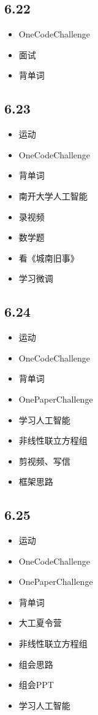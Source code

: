 \documentclass[UTF8]{ctexart}
\begin{document}
\subsection*{6.22}
\begin{itemize}
    \item OneCodeChallenge
    \item 面试
    \item 背单词
\end{itemize}

\subsection*{6.23}
\begin{itemize}
    \item 运动
    \item OneCodeChallenge
    \item 背单词
    \item 南开大学人工智能
    \item 录视频
    \item 数学题
    \item 看《城南旧事》
    \item 学习微调
\end{itemize}

\subsection*{6.24}
\begin{itemize}
    \item 运动
    \item OneCodeChallenge
    \item 背单词
    \item OnePaperChallenge
    \item 学习人工智能
    \item 非线性联立方程组
    \item 剪视频、写信
    \item 框架思路
\end{itemize}

\subsection*{6.25}
\begin{itemize}
    \item 运动
    \item OneCodeChallenge
    \item OnePaperChallenge
    \item 背单词
    \item 大工夏令营
    \item 非线性联立方程组
    \item 组会思路
    \item 组会PPT
    \item 学习人工智能
\end{itemize}
\end{document}
